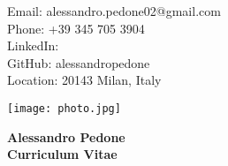 \documentclass[10pt,a4paper]{article}
\begin{document}
\begin{minipage}[c]{0.65\textwidth}
    Email: alessandro.pedone02@gmail.com \\
    Phone: +39 345 705 3904 \\
    LinkedIn: \href{https://linkedin.com/in/alessandro-pedone-58288a368/}{\faLink} \\
    GitHub: alessandropedone \href{https://github.com/alessandropedone}{\faLink} \\
    Location: 20143 Milan, Italy \\

\end{minipage}
\hfill
\begin{minipage}[c]{0.3\textwidth}
    \raggedleft
    \texttt{[image: photo.jpg]}
\end{minipage}

\vspace{12pt}
\begin{center}
    {\LARGE\bfseries Alessandro Pedone} \\
    \vspace{1em}
    {\LARGE\bfseries Curriculum Vitae} \\
\end{center}

\vspace{12pt}
\end{document}
